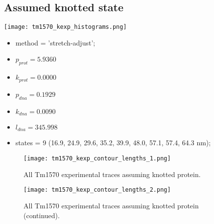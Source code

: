 \subsection{Assumed knotted state}
\label{subsec:fit-details-tm1570-experiment-knotted}
\begin{minipage}[c]{0.7\textwidth}
    \texttt{[image: tm1570\_kexp\_histograms.png]}
\end{minipage}
\hfill
\begin{minipage}[c]{0.45\textwidth}
    \begin{itemize}
        \item method = 'stretch-adjust';
        \item $p_{prot}=5.9360$
        \item $k_{prot}=0.0000$
        \item $p_{dna}=0.1929$
        \item $k_{dna}=0.0090$
        \item $l_{dna}=345.998$
        \item states = 9 (16.9, 24.9, 29.6, 35.2, 39.9, 48.0, 57.1, 57.4, 64.3 nm);
    \end{itemize}
\end{minipage}

\begin{figure}
    \centering
    \texttt{[image: tm1570\_kexp\_contour\_lengths\_1.png]}
    \caption{All Tm1570 experimental traces assuming knotted protein.}
    \label{fig:knotted-tm1570-exp-cl1}
\end{figure}

\begin{figure}
    \centering
    \texttt{[image: tm1570\_kexp\_contour\_lengths\_2.png]}
    \caption{All Tm1570 experimental traces assuming knotted protein (continued).}
    \label{fig:knotted-tm1570-exp-cl2}
\end{figure}

